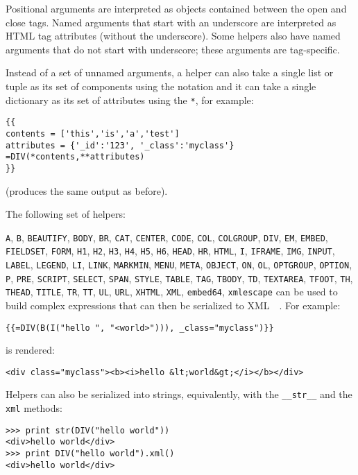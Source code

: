\documentclass[justified,sixbynine,notoc]{tufte-book}
\def\ft{\small\tt}
\begin{document}
\begin{fullwidth}
Positional arguments are interpreted as objects contained between the open and close tags. Named arguments that start with an underscore are interpreted as HTML tag attributes (without the underscore). Some helpers also have named arguments that do not start with underscore; these arguments are tag-specific.

Instead of a set of unnamed arguments, a helper can also take a single list or tuple as its set of components using the {\ft *} notation and it can take a single dictionary as its set of attributes using the {\ft **}, for example:
\begin{lstlisting}[keywords={}]
{{
contents = ['this','is','a','test']
attributes = {'_id':'123', '_class':'myclass'}
=DIV(*contents,**attributes)
}}
\end{lstlisting}
(produces the same output as before).

The following set of helpers:

{\ft A},  {\ft B},  {\ft BEAUTIFY},  {\ft BODY},  {\ft BR},  {\ft CAT},  {\ft CENTER},  {\ft CODE},  {\ft COL}, {\ft COLGROUP}, {\ft DIV},  {\ft EM},  {\ft EMBED},  {\ft FIELDSET},  {\ft FORM},  {\ft H1},  {\ft H2},  {\ft H3},  {\ft H4},  {\ft H5},  {\ft H6},  {\ft HEAD},  {\ft HR},  {\ft HTML},  {\ft I},  {\ft IFRAME},  {\ft IMG},  {\ft INPUT},  {\ft LABEL},  {\ft LEGEND},  {\ft LI},  {\ft LINK},  {\ft MARKMIN},  {\ft MENU},  {\ft META},  {\ft OBJECT},  {\ft ON},  {\ft OL},  {\ft OPTGROUP},  {\ft OPTION},  {\ft P},  {\ft PRE},  {\ft SCRIPT},  {\ft SELECT},  {\ft SPAN},  {\ft STYLE},  {\ft TABLE},  {\ft TAG},  {\ft TBODY},  {\ft TD},  {\ft TEXTAREA},  {\ft TFOOT},  {\ft TH},  {\ft THEAD},  {\ft TITLE},  {\ft TR},  {\ft TT}, {\ft UL},   {\ft URL},  {\ft XHTML},  {\ft XML},  {\ft embed64},  {\ft xmlescape}
\noindent can be used to build complex expressions that can then be serialized to XML~\cite{xml-w}~\cite{xml-o}. For example:
\begin{lstlisting}[keywords={}]
{{=DIV(B(I("hello ", "<world>"))), _class="myclass")}}
\end{lstlisting}
\noindent is rendered:
\begin{lstlisting}[keywords={}]
<div class="myclass"><b><i>hello &lt;world&gt;</i></b></div>
\end{lstlisting}

Helpers can also be serialized into strings, equivalently, with the {\ft \_\_str\_\_} and the {\ft xml} methods:

\begin{lstlisting}
>>> print str(DIV("hello world"))
<div>hello world</div>
>>> print DIV("hello world").xml()
<div>hello world</div>
\end{lstlisting}


\end{fullwidth}
\end{document}
